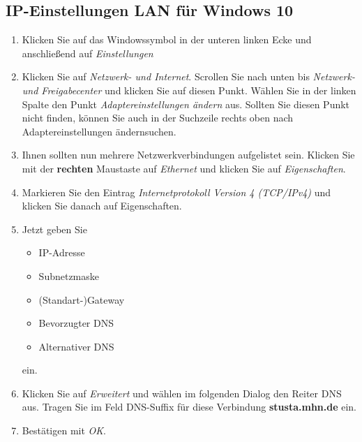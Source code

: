 \documentclass[a4paper,12pt]{scrartcl}
\begin{document}
\subsection{IP-Einstellungen LAN für Windows 10}
\begin{minipage}{0.57\textwidth}
\begin{enumerate}
	\item Klicken Sie auf das Windowssymbol in der unteren linken Ecke und anschließend auf \emph{Einstellungen}
	\item Klicken Sie auf \textit{Netzwerk- und Internet}.
	Scrollen Sie nach unten bis \textit{Netzwerk- und Freigabecenter} und klicken Sie auf diesen Punkt. Wählen Sie in der linken Spalte den Punkt \textit{Adaptereinstellungen ändern} aus.
	Sollten Sie diesen Punkt nicht finden, können Sie auch in der Suchzeile rechts oben nach \glqq Adaptereinstellungen ändern\grqq suchen.
    \item Ihnen sollten nun mehrere Netzwerkverbindungen aufgelistet sein. Klicken Sie mit der \textbf{rechten} Maustaste auf \textit{Ethernet} und klicken Sie auf \textit{Eigenschaften}.
    \item Markieren Sie den Eintrag \textit{Internetprotokoll Version 4 (TCP/IPv4)} und klicken Sie danach auf Eigenschaften.
    \item Jetzt geben Sie
    \begin{itemize}
    	\item IP-Adresse
    	\item Subnetzmaske
    	\item (Standart-)Gateway
    	\item Bevorzugter DNS
    	\item Alternativer DNS
    \end{itemize}
	ein.
    \item Klicken Sie auf \textit{Erweitert} und wählen im folgenden Dialog den Reiter DNS aus. Tragen Sie im Feld DNS-Suffix für diese Verbindung \textbf{stusta.mhn.de} ein.
    \item Bestätigen mit \textit{OK}.
\end{enumerate}
\end{minipage}
\hfill
\end{document}
